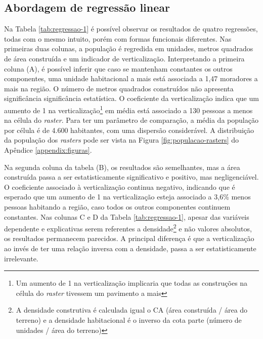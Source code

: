 \subsection{Abordagem de regressão linear}

{\tiny

}

Na Tabela \ref{tab:regressao-1} é possível observar os resultados de quatro regressões, todas com o mesmo intuito, porém com formas funcionais diferentes. Nas primeiras duas colunas, a população é regredida em unidades, metros quadrados de área construída e um indicador de verticalização. Interpretando a primeira coluna (A), é possível inferir que caso se mantenham constantes os outros componentes, uma unidade habitacional a mais está associada a 1,47 moradores a mais na região. O número de metros quadrados construídos não apresenta significância significância estatística. O coeficiente da verticalização indica que um aumento de 1 na verticalização\footnote{Um aumento de 1 na verticalização implicaria que todas as construções na célula do \textit{raster} tivessem um pavimento a mais} em média está associado a 130 pessoas a menos na célula do \textit{raster}. Para ter um parâmetro de comparação, a média da população por célula é de 4.600 habitantes, com uma dispersão considerável. A distribuição da população dos \textit{rasters} pode ser vista na Figura \ref{fig:populacao-rasters} do Apêndice \ref{appendix:figuras}. 

Na segunda coluna da tabela (B),  os resultados são semelhantes, mas a área construída passa a ser estatisticamente significativo e positivo, mas negligenciável. O coeficiente associado à verticalização continua negativo, indicando que é esperado que um aumento de 1 na verticalização esteja associado a 3,6\% menos pessoas habitando a região, caso todos os outros componentes continuem constantes. Nas colunas C e D da Tabela \ref{tab:regressao-1}, apesar das variáveis dependente e explicativas serem referentes a densidade\footnote{A densidade construtiva é calculada igual o CA (área construída / área do terreno) e a densidade habitacional é o inverso da cota parte (número de unidades / área do terreno)} e não valores absolutos, os resultados permanecem parecidos. A principal diferença é que a verticalização ao invés de ter uma relação inversa com a densidade, passa a ser estatisticamente irrelevante.


